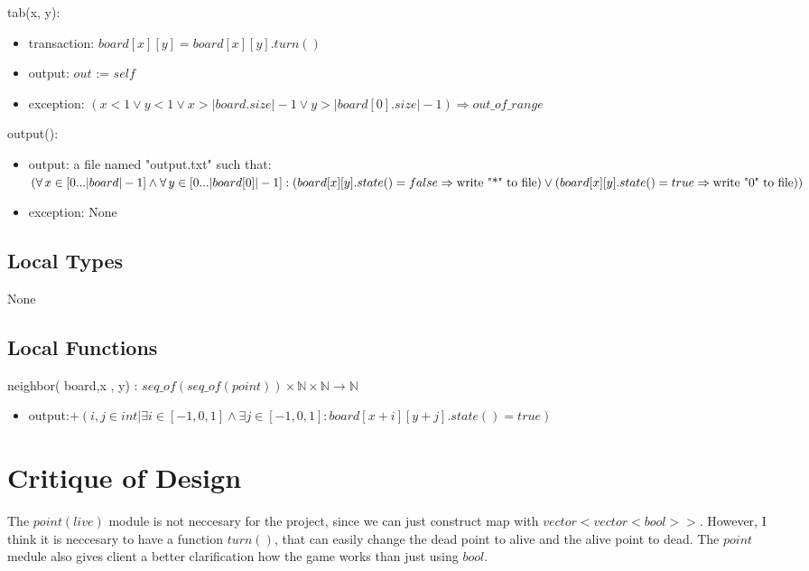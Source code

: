\documentclass[12pt]{article}
\begin{document}
\noindent tab(x, y):
\begin{itemize}
\item transaction: $ board[x][y] = board[x][y].turn()$
\item output:  $out$ := $self$
\item exception: $(x < 1 \lor y < 1 \lor x > |board.size| - 1 \lor y > |board[0].size| - 1) \Rightarrow out\_of\_range$
\end{itemize}

\noindent output():
\begin{itemize}
\item output: a file named "output.txt" such that: \\ $ (\forall\, x
\in [0... |board|-1] \land \forall \, y \in [0... |board[0]|-1] : \\ (board[x][y].state() = false \Rightarrow \text{write "*" to file}) \lor \\
 (board[x][y].state() = true \Rightarrow \text{write "0" to file}))$

\item exception: None

\end{itemize}



\subsection*{Local Types}

None

\subsection*{Local Functions}

\noindent  neighbor( board,x , y) : $seq\_of (seq\_of(point)) \times \mathbb{N} \times \mathbb{N} \rightarrow  \mathbb{N}$ 
\begin{itemize}

\item output:$ + (i,j \in int | \exists i \in [-1, 0, 1] \land \exists j \in [-1, 0 ,1] : board[x+i][y+j].state() = true )$

\end{itemize}


\newpage

\section*{Critique of Design}

The $point(live)$ module is not neccesary for the project, since we can just construct map with $vector<vector<bool>>$. However, I think it
is neccesary to have a function $turn()$, that can easily change the dead point to alive and the alive point to dead. The $point$ medule also 
gives client a better clarification how the game works than just using $bool$. \\
\end{document}
